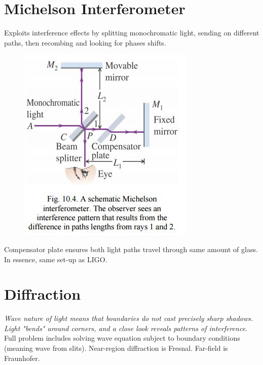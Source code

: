 \documentclass[a4paper, 11pt, normalem]{report}
\begin{document}
\section{Michelson Interferometer}
Exploits interference effects by splitting monochromatic light, sending on different paths, then recombing and looking for phases shifts.
\begin{figure}[H]
    \centering
    \includegraphics[scale=0.8]{Michelson.jpg}
\end{figure}
Compensator plate ensures both light paths travel through same amount of glass.
In essence, same set-up as LIGO.

\section{Diffraction}
\emph{Wave nature of light means that boundaries do not cast precisely sharp shadows. Light "bends" around corners, and a close look reveals patterns of interference.} \\
Full problem includes solving wave equation subject to boundary conditions (meaning wave from slits).
Near-region diffraction is Fresnal.
Far-field is Fraunhofer.
\end{document}
